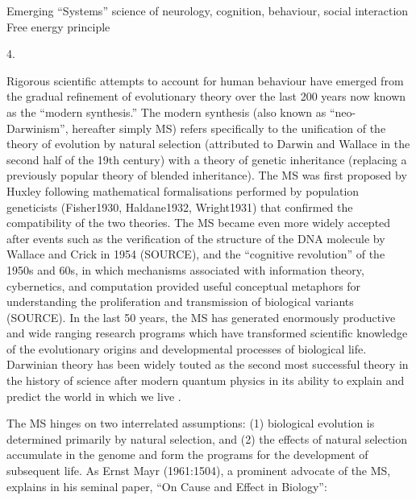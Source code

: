 Emerging ``Systems'' science of neurology, cognition, behaviour, social interaction
Free energy principle


4.



Rigorous scientific attempts to account for human behaviour have emerged from the gradual refinement of evolutionary theory over the last 200 years now known as the ``modern synthesis.''  The modern synthesis (also known as ``neo-Darwinism'', hereafter simply MS) refers specifically to the unification of the theory of evolution by natural selection (attributed to Darwin and Wallace in the second half of the 19th century) with a theory of genetic inheritance (replacing a previously popular theory of blended inheritance). The MS was first proposed by Huxley \citep{Huxley1942} following mathematical formalisations performed by population geneticists (Fisher1930, Haldane1932, Wright1931) that confirmed the compatibility of the two theories.  The MS became even more widely accepted after events such as the verification of the structure of the DNA molecule by Wallace and Crick in 1954 (SOURCE), and the ``cognitive revolution'' of the 1950s and 60s, in which mechanisms associated with information theory, cybernetics, and computation provided useful conceptual metaphors for understanding the proliferation and transmission of biological variants (SOURCE). In the last 50 years, the MS has generated enormously productive and wide ranging research programs which have transformed scientific knowledge of the evolutionary origins and developmental processes of biological life.  Darwinian theory has been widely touted as the second most successful theory in the history of science after modern quantum physics in its ability to explain and predict the world in which we live \citep{Dunbar1996}.

The MS hinges on two interrelated assumptions: (1) biological evolution is determined primarily by natural selection, and (2) the effects of natural selection accumulate in the genome and form the programs for the development of subsequent life. As Ernst Mayr (1961:1504), a prominent advocate of the MS, explains in his seminal paper, ``On Cause and Effect in Biology'':

